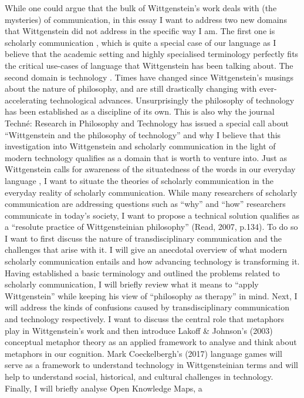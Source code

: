 While one could argue that the bulk of Wittgenstein’s work deals with
(the mysteries) of communication, in this essay I want to address two
new domains that Wittgenstein did not address in the specific way I am.
The first one is scholarly communication , which is quite a
special case of our language as I believe that the academic setting and
highly specialised terminology perfectly fits the critical use-cases of
language that Wittgenstein has been talking about. The second domain is
technology . Times have changed since Wittgenstein’s musings about
the nature of philosophy, and are still drastically changing with
ever-accelerating technological advances. Unsurprisingly the philosophy
of technology has been established as a discipline of its own. This is
also why the journal Techné: Research in Philosophy and
Technology has issued a special call about “Wittgenstein and the
philosophy of technology” and why I believe that this investigation
into Wittgenstein and scholarly communication in the light of modern
technology qualifies as a domain that is worth to venture into. Just as
Wittgenstein calls for awareness of the situatedness of the words in our
everyday language \cite[§116]{Wittgenstein1953}, I want to situate the
theories of scholarly communication in the everyday reality of scholarly
communication. While many researchers of scholarly communication are
addressing questions such as “why” and “how” researchers communicate
in today’s society, I want to propose a technical solution qualifies as
a “resolute practice of Wittgensteinian philosophy” (Read, 2007,
p.134). To do so I want to first discuss the nature of transdisciplinary
communication and the challenges that arise with it. I will give an
anecdotal overview of what modern scholarly communication entails and
how advancing technology is transforming it. Having established a basic
terminology and outlined the problems related to scholarly
communication, I will briefly review what it means to “apply
Wittgenstein” while keeping his view of “philosophy as therapy” in
mind. Next, I will address the kinds of confusions caused by
transdisciplinary communication and technology respectively. I want to
discuss the central role that metaphors play in Wittgenstein’s work and
then introduce Lakoff & Johnson’s (2003) conceptual metaphor
theory as an applied framework to analyse and think about metaphors in
our cognition. Mark Coeckelbergh’s (2017) language games will
serve as a framework to understand technology in Wittgensteinian terms
and will help to understand social, historical, and cultural challenges
in technology. Finally, I will briefly analyse Open Knowledge Maps, a
